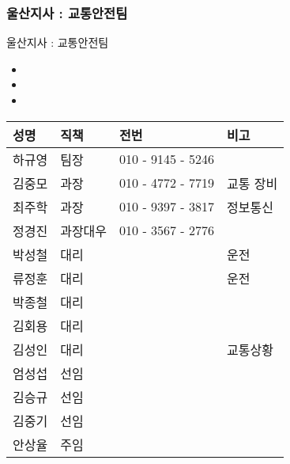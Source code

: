\documentclass[aspectratio=1610,20pt,xcolor=pdftex,dvipsnames,table,handout]{beamer}
\begin{document}
		\begin{frame} [t,plain]
		\frametitle{울산지사 : 교통안전팀 }

			\begin{block} {울산지사 : 교통안전팀 }
			\setlength{\leftmargini}{2em}			
			\begin{itemize}
				\item 
				\item 
				\item 
			\end{itemize}
			\end{block}						

		   \begin{center}
			\label{table:second}
			\setlength{\tabcolsep}{0pt}

			\tiny {
		     	\begin{tabularx}{\textwidth}{ p{} p{} p{} p{}   }\hline
				성명   	& 직책		& 전번  		&비고			\\ \hline				\hline				

				하규영	&	팀장			&	010 - 9145 - 5246	&		 \\ \hline		
				김중모	&	과장			&	010 - 4772 - 7719	&	교통 장비	 \\ \hline		
				최주학	&	과장			&	010 - 9397 - 3817	&	정보통신	 \\ \hline		
				정경진	&	과장대우		&	010 - 3567 - 2776	&		 \\ \hline	\hline		

				박성철	&	대리	&		&	운전	 \\ \hline		
				류정훈	&	대리	&		&	운전	 \\ \hline		
				박종철	&	대리	&		&		 \\ \hline		
				김회용	&	대리	&		&		 \\ \hline		
				김성인	&	대리	&		&	교통상황	 \\ \hline  \hline		
				엄성섭	&	선임	&		&		 \\ \hline		
				김승규	&	선임	&		&		 \\ \hline		
				김중기	&	선임	&		&		 \\ \hline		
				안상율	&	주임	&		&		 \\ \hline	  \hline			
													

\end{tabularx}}
\end{center}
\end{frame}
\end{document}
